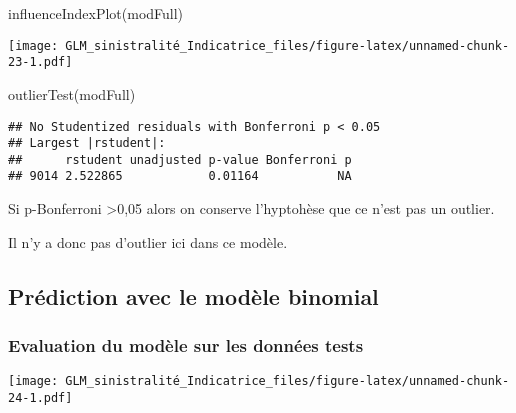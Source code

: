 \documentclass[
]{article}
\newenvironment{Shaded}{\begin{snugshade}}{\end{snugshade}}
\newcommand{\FunctionTok}[1]{\textcolor[rgb]{0.00,0.00,0.00}{#1}}
\newcommand{\NormalTok}[1]{#1}
\newcommand{\OtherTok}[1]{\textcolor[rgb]{0.56,0.35,0.01}{#1}}
\newcommand{\SpecialCharTok}[1]{\textcolor[rgb]{0.00,0.00,0.00}{#1}}
\begin{document}
\begin{Shaded}
\begin{Highlighting}[]
\FunctionTok{influenceIndexPlot}\NormalTok{(modFull)}
\end{Highlighting}
\end{Shaded}

\texttt{[image: GLM\_sinistralité\_Indicatrice\_files/figure-latex/unnamed-chunk-23-1.pdf]}

\begin{Shaded}
\begin{Highlighting}[]
\FunctionTok{outlierTest}\NormalTok{(modFull)}
\end{Highlighting}
\end{Shaded}

\begin{verbatim}
## No Studentized residuals with Bonferroni p < 0.05
## Largest |rstudent|:
##      rstudent unadjusted p-value Bonferroni p
## 9014 2.522865            0.01164           NA
\end{verbatim}

Si p-Bonferroni \textgreater0,05 alors on conserve l'hyptohèse que ce
n'est pas un outlier.

Il n'y a donc pas d'outlier ici dans ce modèle.

\hypertarget{pruxe9diction-avec-le-moduxe8le-binomial}{%
\subsection{Prédiction avec le modèle
binomial}\label{pruxe9diction-avec-le-moduxe8le-binomial}}

\hypertarget{evaluation-du-moduxe8le-sur-les-donnuxe9es-tests}{%
\subsubsection{Evaluation du modèle sur les données
tests}\label{evaluation-du-moduxe8le-sur-les-donnuxe9es-tests}}

\begin{Shaded}
\end{Shaded}

\texttt{[image: GLM\_sinistralité\_Indicatrice\_files/figure-latex/unnamed-chunk-24-1.pdf]}
\end{document}
